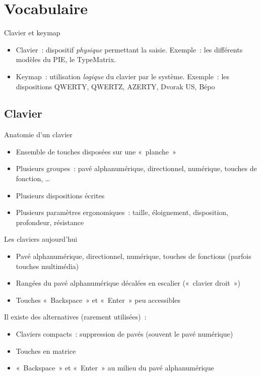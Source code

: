 \section{Vocabulaire}

\begin{frame}{Clavier et keymap}
  \begin{itemize}
    \item Clavier~: dispositif \emph{physique} permettant la saisie. Exemple~: les différents modèles du PIE, le TypeMatrix. \pause
    \item Keymap~: utilisation \emph{logique} du clavier par le système. Exemple~: les dispositions QWERTY, QWERTZ, AZERTY, Dvorak US,  Bépo
  \end{itemize}
\end{frame}



\subsection{Clavier}

\begin{frame}{Anatomie d’un clavier}
  \begin{itemize}
    \item Ensemble de touches disposées sur une «~planche~» \pause
    \item Plusieurs groupes~: pavé alphanumérique, directionnel, numérique, touches de fonction, … \pause
    \item Plusieurs dispositions écrites \pause
    \item Plusieurs paramètres ergonomiques~: taille, éloignement, disposition, profondeur, résistance
  \end{itemize}
\end{frame}

\begin{frame}{Les claviers aujourd’hui}
  \begin{itemize}
    \item Pavé alphanumérique, directionnel, numérique, touches de fonctions (parfois touches multimédia) \pause
    \item Rangées du pavé alphanumérique décalées en escalier («~clavier droit~») \pause
    \item Touches «~Backspace~» et «~Enter~» peu accessibles \pause
  \end{itemize}

  Il existe des alternatives (rarement utilisées)~: \pause
  \begin{itemize}
    \item Claviers compacts~: suppression de pavés (souvent le pavé numérique) \pause
    \item Touches en matrice \pause
    \item «~Backspace~» et «~Enter~» au milieu du pavé alphanumérique
  \end{itemize}
\end{frame}




